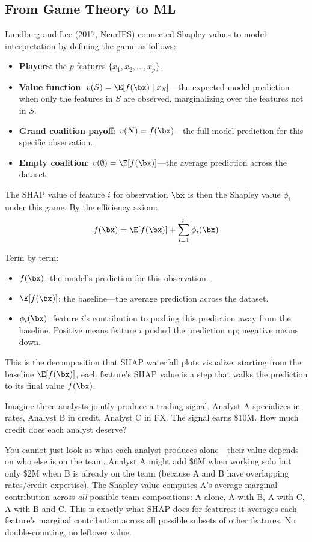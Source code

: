 \subsection{From Game Theory to ML}

Lundberg and Lee (2017, NeurIPS) connected Shapley values to model interpretation by defining the game as follows:
\begin{itemize}[nosep]
  \item \textbf{Players}: the $p$ features $\{x_1, x_2, \ldots, x_p\}$.
  \item \textbf{Value function}: $v(S) = \E[f(\bx) \mid x_S]$---the expected model prediction when only the features in $S$ are observed, marginalizing over the features not in $S$.
  \item \textbf{Grand coalition payoff}: $v(N) = f(\bx)$---the full model prediction for this specific observation.
  \item \textbf{Empty coalition}: $v(\emptyset) = \E[f(\bx)]$---the average prediction across the dataset.
\end{itemize}

The SHAP value of feature $i$ for observation $\bx$ is then the Shapley value $\phi_i$ under this game.
By the efficiency axiom:
\begin{equation}
f(\bx) = \E[f(\bx)] + \sum_{i=1}^p \phi_i(\bx)
\label{eq:shap-efficiency}
\end{equation}

Term by term:
\begin{itemize}[nosep]
  \item $f(\bx)$: the model's prediction for this observation.
  \item $\E[f(\bx)]$: the baseline---the average prediction across the dataset.
  \item $\phi_i(\bx)$: feature $i$'s contribution to pushing this prediction away from the baseline. Positive means feature $i$ pushed the prediction up; negative means down.
\end{itemize}

This is the decomposition that SHAP waterfall plots visualize: starting from the baseline $\E[f(\bx)]$, each feature's SHAP value is a step that walks the prediction to its final value $f(\bx)$.

\begin{intuition}
Imagine three analysts jointly produce a trading signal.
Analyst A specializes in rates, Analyst B in credit, Analyst C in FX.
The signal earns \$10M.
How much credit does each analyst deserve?

You cannot just look at what each analyst produces alone---their value depends on who else is on the team.
Analyst A might add \$6M when working solo but only \$2M when B is already on the team (because A and B have overlapping rates/credit expertise).
The Shapley value computes A's average marginal contribution across \emph{all} possible team compositions: A alone, A with B, A with C, A with B and C.
This is exactly what SHAP does for features: it averages each feature's marginal contribution across all possible subsets of other features.
No double-counting, no leftover value.
\end{intuition}

